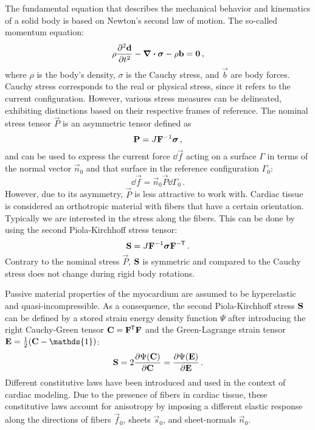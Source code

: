 The fundamental equation that describes the mechanical behavior and kinematics of a solid body is based on Newton's second law of motion.
The so-called momentum equation:
\begin{equation}
    \rho \pdv[2]{\d}{t}- \div{\vec\sigma} - \rho \vec b = \vec 0 \,, \label{eq:linmomentum}
\end{equation}
where $\rho$ is the body's density, $\sigma$ is the Cauchy stress, and $\vec b$ are body forces.
Cauchy stress corresponds to the real or physical stress, since it refers to the
current configuration.
However, various stress measures can be delineated, exhibiting distinctions based on their respective frames of reference.
The nominal stress tensor $\vec P$ is an asymmetric tensor defined as 
\begin{equation}
    \vec P = J \F^{-1} \vec\sigma \,,
\end{equation}
and can be used to express the current force $\dd{\vec f}$ acting on a surface $\Gamma$ in terms of the normal vector $\vec n_0$ and that surface in the reference configuration $\Gamma_0$:
\begin{equation}
    \dd{\vec f} = \vec n_0 \vec P \dd{\Gamma_0} \,.
\end{equation}
However, due to its asymmetry, $\vec P$ is less attractive to work with.
Cardiac tissue is considered an orthotropic material with fibers that have a certain orientation.
Typically we are interested in the stress along the fibers.
This can be done by using the second Piola-Kirchhoff stress tensor:
\begin{equation}
    \S = J \F^{-1}\vec \sigma \F^{-\tran} \,.
\end{equation}
Contrary to the nominal stress $\vec P$, $\S$ is symmetric and compared to the Cauchy stress does not change during rigid body rotations.

Passive material properties of the myocardium are assumed to be hyperelastic and quasi-incompressible.
As a consequence, the second Piola-Kirchhoff stress $\S$ can be defined by a stored strain energy density function $\Psi$ after introducing the right Cauchy-Green tensor $\C = \F^\tran\F$ and the Green-Lagrange strain tensor $\E = \frac{1}{2}(\C - \mathds{1})$:
\begin{equation}
    \S = 2 \pdv{\Psi(\C)}{\C} = \pdv{\Psi(\E)}{\E} \,.
\end{equation}
Different constitutive laws have been introduced and used in the context of cardiac modeling.
Due to the presence of fibers in cardiac tissue, these constitutive laws account for anisotropy by imposing a different elastic response along the directions of fibers $\vec f_0$, sheets $\vec s_0$, and sheet-normals $\vec n_0$.

